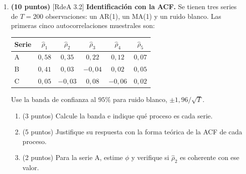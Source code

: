 \documentclass[12pt,letterpaper]{article}
\newcommand{\rdea}[1]{\textsf{\small [RdeA #1]}}
\DeclareMathOperator{\cov}{Cov}
\DeclareMathOperator{\var}{Var}
\begin{document}
\begin{enumerate}
{\begin{enumerate}[label=\alph*)]
    \item Con la base en el Norte, el salario esperado en logaritmos es $\beta_0+\delta_2+\beta_1exper$ en el Centro y $\beta_0+\delta_1+\beta_1exper$ en el Sur. La diferencia es
    \[
        \hat\delta_2-\hat\delta_1=0{,}18-(-0{,}07)=0{,}25 ,
    \]
    es decir, $\approx25\%$ más en el Centro que en el Sur (exacto: $e^{0{,}25}-1\approx28{,}4\%$) \textbf{(2 puntos)}.

    \textbf{Test:} $H_0:\delta_2-\delta_1=0$ versus $H_1:\delta_2-\delta_1\neq0$, con
    \[
        t=\frac{\hat\delta_2-\hat\delta_1}{ee(\hat\delta_2-\hat\delta_1)},\qquad
        ee(\hat\delta_2-\hat\delta_1)=\sqrt{\widehat{\var}(\hat\delta_2)+\widehat{\var}(\hat\delta_1)-2\,\widehat{\cov}(\hat\delta_1,\hat\delta_2)} .
    \]
    Se necesita la covarianza entre los estimadores, que sale de la matriz de varianzas y covarianzas. Alternativa más simple: re-estimar el modelo con el \textbf{Sur como categoría base} (incluyendo $Norte$ y $Centro$) y testear si el coeficiente de $Centro$ es cero \textbf{(2 puntos)}.
\end{enumerate}}

\item \textbf{(10 puntos)} \rdea{3.2} \textbf{Identificación con la ACF.} Se tienen tres series de $T=200$ observaciones: un AR(1), un MA(1) y un ruido blanco. Las primeras cinco autocorrelaciones muestrales son:

\begin{center}
\begin{tabular}{lccccc}
\hline\hline
Serie & $\hat\rho_1$ & $\hat\rho_2$ & $\hat\rho_3$ & $\hat\rho_4$ & $\hat\rho_5$ \\ \hline
A & $0{,}58$ & $0{,}35$ & $0{,}22$ & $0{,}12$ & $0{,}07$ \\
B & $0{,}41$ & $0{,}03$ & $-0{,}04$ & $0{,}02$ & $0{,}05$ \\
C & $0{,}05$ & $-0{,}03$ & $0{,}08$ & $-0{,}06$ & $0{,}02$ \\
\hline\hline
\end{tabular}
\end{center}

Use la banda de confianza al $95\%$ para ruido blanco, $\pm1{,}96/\sqrt{T}$.

\begin{enumerate}[label=\alph*)]
    \item (3 puntos) Calcule la banda e indique qué proceso es cada serie.
    \item (5 puntos) Justifique su respuesta con la forma teórica de la ACF de cada proceso.
    \item (2 puntos) Para la serie A, estime $\phi$ y verifique si $\hat\rho_2$ es coherente con ese valor.
\end{enumerate}


\end{enumerate}
\end{document}
